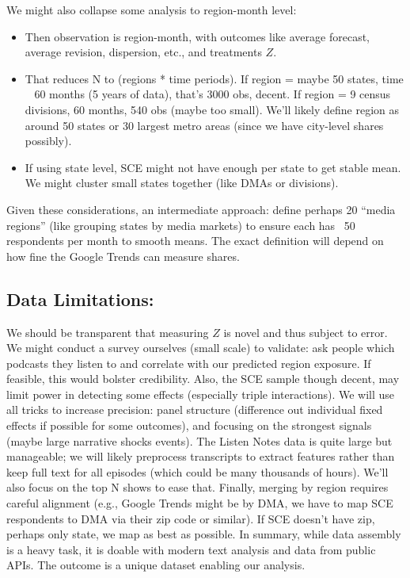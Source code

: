 \documentclass[12pt]{article}
\begin{document}
We might also collapse some analysis to region-month level:
\begin{itemize}
    \item Then observation is region-month, with outcomes like average forecast, average revision, dispersion, etc., and treatments $Z$.
    \item That reduces N to (regions * time periods). If region = maybe 50 states, time ~ 60 months (5 years of data), that's 3000 obs, decent. If region = 9 census divisions, 60 months, 540 obs (maybe too small). We'll likely define region as around 50 states or 30 largest metro areas (since we have city-level shares possibly).
    \item If using state level, SCE might not have enough per state to get stable mean. We might cluster small states together (like DMAs or divisions).
\end{itemize}

Given these considerations, an intermediate approach: define perhaps 20 ``media regions'' (like grouping states by media markets) to ensure each has ~50 respondents per month to smooth means. The exact definition will depend on how fine the Google Trends can measure shares.

\subsection{Data Limitations:}
We should be transparent that measuring $Z$ is novel and thus subject to error. We might conduct a survey ourselves (small scale) to validate: ask people which podcasts they listen to and correlate with our predicted region exposure. If feasible, this would bolster credibility.
Also, the SCE sample though decent, may limit power in detecting some effects (especially triple interactions). We will use all tricks to increase precision: panel structure (difference out individual fixed effects if possible for some outcomes), and focusing on the strongest signals (maybe large narrative shocks events).
The Listen Notes data is quite large but manageable; we will likely preprocess transcripts to extract features rather than keep full text for all episodes (which could be many thousands of hours). We'll also focus on the top N shows to ease that.
Finally, merging by region requires careful alignment (e.g., Google Trends might be by DMA, we have to map SCE respondents to DMA via their zip code or similar). If SCE doesn't have zip, perhaps only state, we map as best as possible.
In summary, while data assembly is a heavy task, it is doable with modern text analysis and data from public APIs. The outcome is a unique dataset enabling our analysis.
\end{document}
